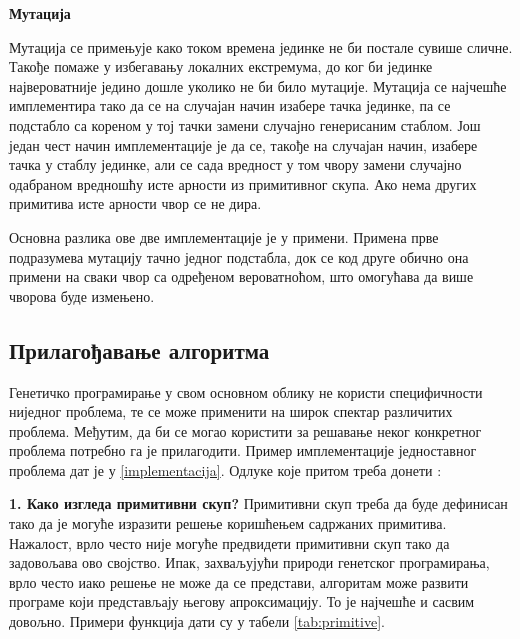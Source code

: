 \documentclass[a4paper]{article}
\begin{document}
\medskip
\noindent
\textbf{\large Мутација}\newline

Мутација се примењује како током времена јединке не би постале сувише сличне. Такође помаже у избегавању локалних екстремума, до ког би јединке највероватније једино дошле уколико не би било мутације.
Мутација се најчешће имплементира тако да се на случајан начин изабере тачка јединке, па се подстабло са кореном у тој тачки замени случајно генерисаним стаблом. Још један чест начин имплементације је да се, такође на случајан начин, изабере тачка у стаблу јединке, али се сада вредност у том чвору замени случајно одабраном вредношћу исте арности из примитивног скупа. Ако нема других примитива исте арности чвор се не дира. 

Основна разлика ове две имплементације је у примени. Примена прве подразумева мутацију тачно једног подстабла, док се код друге обично она примени на сваки чвор са одређеном вероватноћом, што омогућава да више чворова буде измењено. 

\subsection{Прилагођавање алгоритма}

Генетичко програмирање у свом основном облику не користи специфичности ниједног проблема, те се може применити на широк спектар различитих проблема. Међутим, да би се могао користити за решавање неког конкретног проблема потребно га је прилагодити. Пример имплементације једноставног проблема дат је у \ref{implementacija}. Одлуке које притом треба донети \cite{fieldGuidetoGP}:\newline

\textbf{1. Како изгледа примитивни скуп?}\newline
Примитивни скуп треба да буде дефинисан тако да је могуће изразити решење коришћењем садржаних примитива. Нажалост, врло често није могуће предвидети примитивни скуп тако да задовољава ово својство. Ипак, захваљујући природи генетског програмирања, врло често иако решење не може да се представи, алгоритам може развити програме који представљају његову апроксимацију. То је најчешће и сасвим довољно. Примери функција дати су у табели \ref{tab:primitive}. \newline
    
\end{document}
